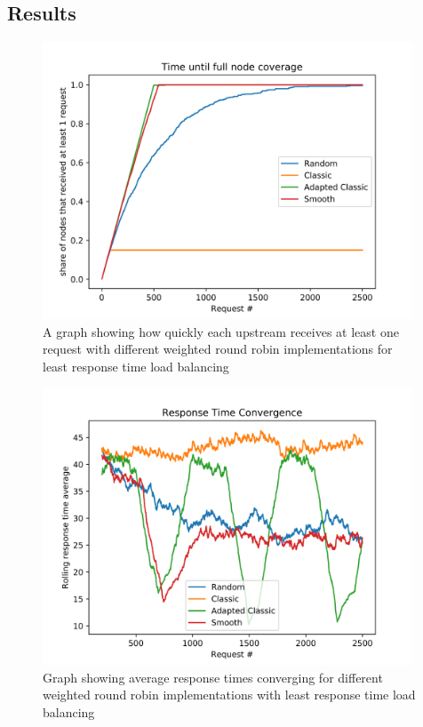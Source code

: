 \subsection{Results}

\begin{figure}
    \centering
    \includegraphics[width=11cm]{graphics/graphs/lb_imp_upstream_coverage.png}
    \caption{A graph showing how quickly each upstream receives at least one request with different weighted round robin implementations for least response time load balancing}
    \label{fig:lb_imp_upstream_coverage}
\end{figure}

\begin{figure}
    \centering
    \includegraphics[width=11cm]{graphics/graphs/lb_imp_trt_convergence.png}
    \caption{Graph showing average response times converging for different weighted round robin implementations with least response time load balancing}
    \label{fig:lb_imp_rt_convergence}
\end{figure}

